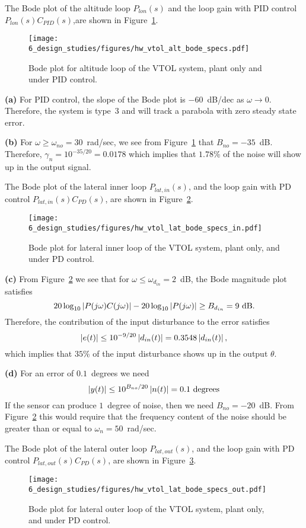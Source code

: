 
The Bode plot of the altitude loop $P_{lon}(s)$ and the loop gain  with PID control $P_{lon}(s)C_{PID}(s)$,are shown in Figure~\ref{fig:hw_vtol_alt_bode_specs}.
\begin{figure}[H]
   \centering
   \texttt{[image: 6\_design\_studies/figures/hw\_vtol\_alt\_bode\_specs.pdf]}
   \caption{Bode plot for altitude loop of the VTOL system, plant only and under PID control.}
   \label{fig:hw_vtol_alt_bode_specs}
\end{figure}

{\bf (a)}
For PID control, the slope of the Bode plot is $-60$~dB/dec as $\omega\to 0$.  Therefore, the system is type~3 and will track a parabola with zero steady state error. 

{\bf (b)} For $\omega\geq\omega_{no}=30$~rad/sec, we see from Figure~\ref{fig:hw_vtol_alt_bode_specs} that $B_{no} = -35$~dB.  Therefore, $\gamma_n = 10^{-35/20} = 0.0178$ which implies that $1.78$\% of the noise will show up in the output signal.

The Bode plot of the lateral inner loop $P_{lat,in}(s)$, and the loop gain with PD control $P_{lat,in}(s)C_{PD}(s)$, are shown in Figure~\ref{fig:hw_vtol_lat_bode_specs_in}.
\begin{figure}[H]
   \centering
   \texttt{[image: 6\_design\_studies/figures/hw\_vtol\_lat\_bode\_specs\_in.pdf]}
   \caption{Bode plot for lateral inner loop of the VTOL system, plant only, and under PD control.}
   \label{fig:hw_vtol_lat_bode_specs_in}
\end{figure}

{\bf (c)}
From Figure~\ref{fig:hw_vtol_lat_bode_specs_in} we see that for $\omega\leq\omega_{d_{in}}=2$~dB, the Bode magnitude plot satisfies 
\[
20\log_{10}\left|P(j\omega)C(j\omega)\right|-20\log_{10}\left|P(j\omega)\right| \geq B_{d_{in}}=9\text{~dB}.
\]  
Therefore, the contribution of the input disturbance to the error satisfies
\[
\left|e(t)\right| \leq 10^{-9/20}\left|d_{in}(t)\right| = 0.3548\left|d_{in}(t)\right|,
\]
which implies that $35$\% of the input disturbance shows up in the output $\theta$.

{\bf (d)}
For an error of $0.1$~degrees we need 
\[
\left|y(t)\right|\leq 10^{B_{no}/20}\left|n(t)\right| = 0.1 \text{~degrees} 
\]
If the sensor can produce $1$~degree of noise, then we need $B_{no}=-20$~dB.  From Figure~\ref{fig:hw_vtol_lat_bode_specs_in} this would require that the frequency content of the noise should be greater than or equal to $\omega_n=50$~rad/sec.

The Bode plot of the lateral outer loop $P_{lat,out}(s)$, and the loop gain with PD control $P_{lat,out}(s)C_{PD}(s)$, are shown in Figure~\ref{fig:hw_vtol_lat_bode_specs_out}.
\begin{figure}[H]
   \centering
   \texttt{[image: 6\_design\_studies/figures/hw\_vtol\_lat\_bode\_specs\_out.pdf]}
   \caption{Bode plot for lateral outer loop of the VTOL system, plant only, and under PD control.}
   \label{fig:hw_vtol_lat_bode_specs_out}
\end{figure}


